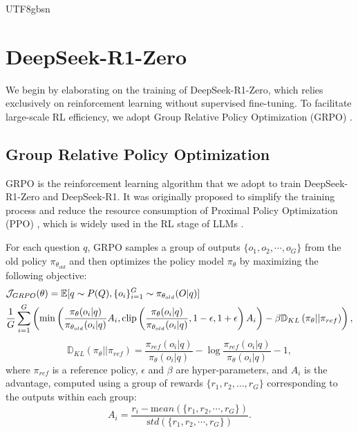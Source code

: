 \documentclass[11pt, a4paper, logo, copyright, nonumbering]{deepseek}
\begin{document}
\begin{CJK*}{UTF8}{gbsn}
\section{ DeepSeek-R1-Zero}

\label{sec:ds-zero}
We begin by elaborating on the training of DeepSeek-R1-Zero, which relies exclusively on reinforcement learning without supervised fine-tuning. To facilitate large-scale RL efficiency, we adopt Group Relative Policy Optimization (GRPO) \citep{deepseekmath}.


\subsection{Group Relative Policy Optimization} \label{method:grpo}
GRPO \citep{deepseekmath} is the reinforcement learning algorithm that we adopt to train DeepSeek-R1-Zero and DeepSeek-R1. It was originally proposed to simplify the training process and reduce the resource consumption of Proximal Policy Optimization (PPO) \citep{schulman2017proximal}, which is widely used in the RL stage of LLMs \citep{ouyang2022training}. 

For each question $q$, GRPO samples a group of outputs $\{o_1, o_2, \cdots, o_G\}$ from the old policy $\pi_{\theta_{old}}$ and then optimizes the policy model $\pi_{\theta}$ by maximizing the following objective:
\begin{equation}
\begin{split}
    \footnotesize
    & \mathcal{J}_{GRPO}(\theta) = \mathbb{E}{[q \sim P(Q), \{o_i\}_{i=1}^G \sim \pi_{\theta_{old}}(O|q)]}  \\
    & \frac{1}{G}\sum_{i=1}^G \left( \min \left( \frac{\pi_\theta(o_i |q)}{\pi_{\theta_{old}}(o_i |q)} A_i, \text{clip} \left( \frac{\pi_\theta(o_i |q)}{\pi_{\theta_{old}}(o_i |q)}, 1 - \epsilon, 1 + \epsilon \right)  A_i \right) - \beta \mathbb{D}_{KL}\left(\pi_{\theta} || \pi_{ref}\right)\right) ,
\end{split}
\label{eq:GRPO-obj}
\end{equation}
\begin{equation}
    \mathbb{D}_{KL}\left(\pi_{\theta} || \pi_{ref}\right) = \frac{\pi_{ref}(o_i|q)}{\pi_{\theta}(o_i|q)}- \log\frac{\pi_{ref}(o_i|q)}{\pi_{\theta}(o_i|q)} - 1,
\end{equation}
where $\pi_{ref}$ is a reference policy, $\epsilon$ and $\beta$ are hyper-parameters, and $A_i$ is the advantage, computed using a group of rewards $\{r_1, r_2, \ldots, r_G\}$ corresponding to the outputs within each group:
\begin{equation}
    A_i = \frac{r_i - {\mathrm mean(\{r_1, r_2, \cdots, r_G\})}}{{\mathrm std(\{r_1, r_2, \cdots, r_G\})}}.
\end{equation}


\end{CJK*}
\end{document}
